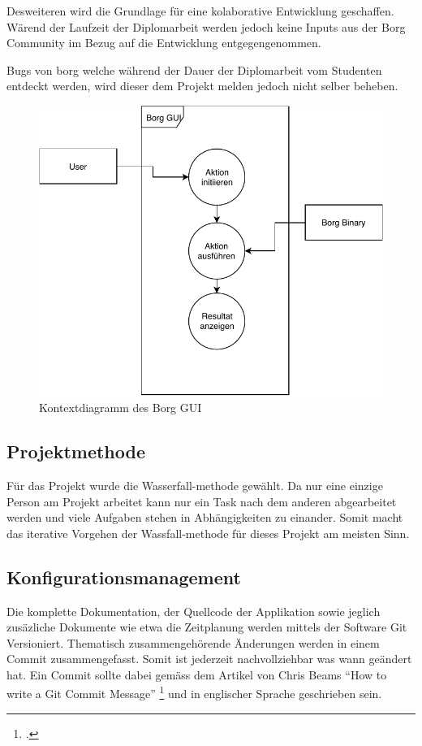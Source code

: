 Desweiteren wird die Grundlage für eine kolaborative Entwicklung geschaffen.
Wärend der Laufzeit der Diplomarbeit werden jedoch keine Inputs aus der Borg
Community im Bezug auf die Entwicklung entgegengenommen.

Bugs von \gls{borg} welche während der Dauer der Diplomarbeit vom Studenten
entdeckt werden, wird dieser dem Projekt melden jedoch nicht selber beheben.

\begin{figure}[htbp]
\centering
\includegraphics[width=.9\linewidth]{pictures/kontextdiagramm.pdf}
\caption{\label{fig:org76deb14}
Kontextdiagramm des Borg GUI}
\end{figure}

\subsection{Projektmethode}
\label{sec:org80b7496}

Für das Projekt wurde die Wasserfall-methode gewählt. Da nur eine
einzige Person am Projekt arbeitet kann nur ein Task nach dem anderen
abgearbeitet werden und viele Aufgaben stehen in Abhängigkeiten zu einander.
Somit macht das iterative Vorgehen der Wassfall-methode für dieses Projekt am
meisten Sinn.

\subsection{Konfigurationsmanagement}
\label{sec:org4265bb4}

Die komplette Dokumentation, der Quellcode der Applikation sowie jeglich
zusäzliche Dokumente wie etwa die Zeitplanung werden mittels der Software Git
Versioniert. Thematisch zusammengehörende Änderungen werden in einem Commit
zusammengefasst. Somit ist jederzeit nachvollziehbar was wann geändert hat. Ein
Commit sollte dabei gemäss dem Artikel von Chris Beams "`How to write a Git
Commit Message"' \footcite{commit} und in englischer Sprache geschrieben sein.

